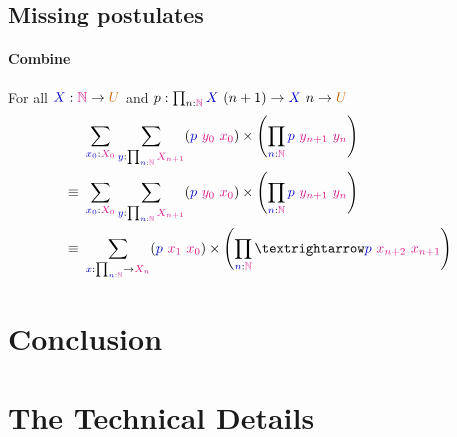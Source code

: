 \documentclass[twoside,11pt,openright]{report}
\newcommand*{\term}[1]{\textcolor{blue!80!black}{#1}}
\newcommand*{\type}[1]{\textcolor{magenta!90!black}{#1}}
\newcommand*{\universe}[1]{\textcolor{orange!80!black}{#1}}
\begin{document}
\section{Missing postulates}
\subsubsection{Combine}
For all \(\term{X} : \type{\mathbb{N}} \rightarrow \universe{U}\) and \(p : \prod_{n : \type{\mathbb{N}}} \term{X}~(n + 1) \rightarrow \term{X}~n \rightarrow \universe{U}\)
\begin{align}
  &~\sum_{\term{x_0} : \type{X_0}} \sum_{\term{y} : \prod_{\term{n} : \type{\mathbb{N}}} \type{X_{n+1}}} (\term{p}~\type{y_0}~\type{x_0}) \times \left(\prod_{\term{n} : \type{\mathbb{N}}} \term{p}~\type{y_{n + 1}}~\type{y_n}\right) \\
  \equiv&~\sum_{\term{x_0} : \type{X_0}} \sum_{\term{y} : \prod_{\term{n} : \type{\mathbb{N}}} \type{X_{n+1}}} (\term{p}~\type{y_0}~\type{x_0}) \times \left(\prod_{\term{n} : \type{\mathbb{N}}} \term{p}~\type{y_{n + 1}}~\type{y_n}\right) \\
  \equiv&~\sum_{\term{x} : \prod_{\term{n} : \type{\mathbb{N}}} \rightarrow \type{X_n}} (\term{p}~\type{x_1}~\type{x_0}) \times \left(\prod_{\term{n} : \type{\mathbb{N}}} → \term{p}~\type{x_{n+2}}~\type{x_{n+1}}\right)
\end{align}



\chapter{Conclusion}
\label{ch:conclusion}



\cleardoublepage
{}
 



\cleardoublepage
\appendix
\chapter{The Technical Details}

\todo[inline]{\dots}
\end{document}
